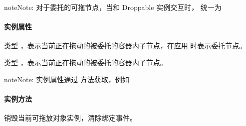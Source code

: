\documentclass[letterpaper,10pt,english]{sphinxmanual}
\begin{document}
\begin{notice}{note}{Note:}
对于委托的可拖节点，当和 Droppable 实例交互时， {\hyperref[api/component/dd/draggable:DD.Draggable.config.mode]{}} 统一为 {\hyperref[api/component/dd/draggable:DD.Draggable.POINT]{}}
\end{notice}


\paragraph{实例属性}
\label{api/component/dd/draggable-delegate:id3}

\begin{fulllineitems}
\label{api/component/dd/draggable-delegate:DD.DraggableDelegate.node}
类型  ，表示当前正在拖动的被委托的容器内子节点，在应用  时表示委托节点。

\end{fulllineitems}



\begin{fulllineitems}
\label{api/component/dd/draggable-delegate:DD.DraggableDelegate.dragNode}
类型  ，表示当前正在拖动的被委托的容器内子节点。

\end{fulllineitems}


\begin{notice}{note}{Note:}
实例属性通过  方法获取，例如 
\end{notice}


\paragraph{实例方法}
\label{api/component/dd/draggable-delegate:id4}

\begin{fulllineitems}
\label{api/component/dd/draggable-delegate:DD.DraggableDelegate.destroy}
销毁当前可拖放对象实例，清除绑定事件。

\end{fulllineitems}
\end{document}
